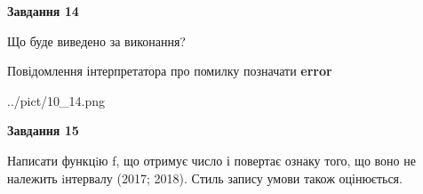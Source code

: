 \documentclass[11pt, ukrainian]{article}
\begin{document}
{\begin {large}
{\begin {center}\textbf{Завдання 14}\end {center}}\par
Що буде виведено за виконання? \par
Повідомлення інтерпретатора про помилку позначати \textbf{error}

\begin{center}
	{../pict/10_14.png}
\end{center}
\newpage

{\begin {center}\textbf{Завдання 15}\end {center}}\par

Написати функцiю f, що отримує число і повертає ознаку того, що воно не належить iнтервалу (2017; 2018). Стиль запису умови також оцінюється.\par
\newpage

\end {large}}
\end{document}
